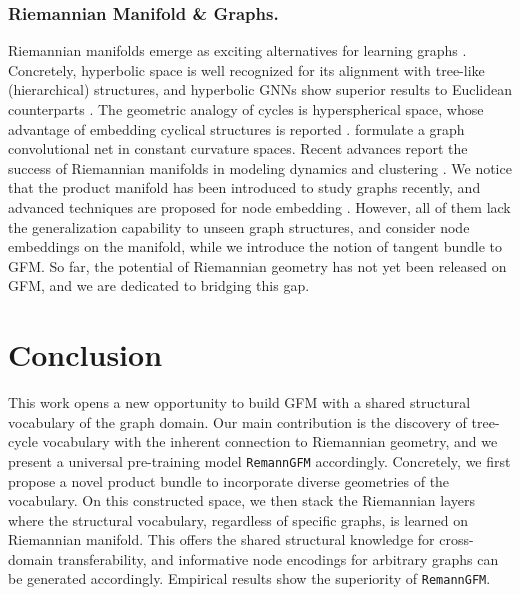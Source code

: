 \subsubsection*{\textbf{Riemannian Manifold \& Graphs.}}
Riemannian manifolds emerge as exciting alternatives for learning graphs \cite{nips24sun,aaai24sun,icdm23sun}.
Concretely, hyperbolic space is well recognized for its alignment with tree-like (hierarchical) structures,
and hyperbolic GNNs show superior results to Euclidean counterparts \cite{nips18hnn,nips19hgcn}. 
The geometric analogy of cycles is hyperspherical space, whose advantage of embedding cyclical structures is reported \cite{22cikmSpherical,nips19sphericalText}. 
\citet{icml20Constant} formulate a graph convolutional net in constant curvature spaces.
Recent advances report the success of Riemannian manifolds in modeling dynamics  \cite{aaai21sun,cikm22sun,aaai23sun,aaai25sun,www23ye} and clustering \cite{icml24sun,www24sun,ijcai23sun}.
We notice that the product manifold has been introduced to study graphs recently, 
and advanced techniques are proposed for node embedding \cite{iclr19mixCurvature,iclr23lantentGraphProduct,aaai22selfMG,cikm24wang}.
However, all of them lack the generalization capability to unseen graph structures, and consider node embeddings on the manifold, while we introduce the notion of tangent bundle to GFM.
So far, the potential of Riemannian geometry has not yet been released on GFM, and we are dedicated to bridging this gap.

  \vspace{-0.1in}
  \section{Conclusion}
This work opens a new opportunity to build GFM with a shared structural vocabulary of the graph domain.
Our main contribution is the discovery of tree-cycle vocabulary with the inherent connection to Riemannian geometry, and we present a universal pre-training model \texttt{RemannGFM} accordingly.
Concretely, 
we first propose a novel product bundle to incorporate diverse geometries of the vocabulary. 
On this constructed space, we then stack the Riemannian layers where the structural vocabulary, regardless of specific graphs, is learned on Riemannian manifold.
This offers the shared structural knowledge for cross-domain transferability, 
and informative node encodings  for arbitrary graphs can be generated accordingly. 
Empirical results show the superiority of \texttt{RemannGFM}.

